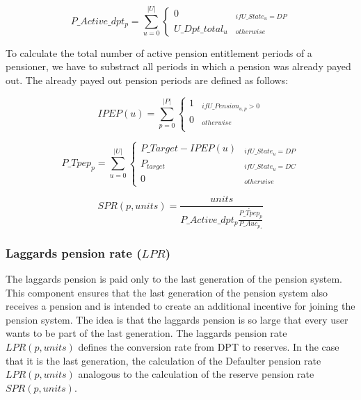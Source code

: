 \begin{equation}
P\_Active\_dpt_{p} = \sum_{u=0}^{|U|} \begin{cases} 
0 & _{if U\_State_{u} = DP}\\
U\_Dpt\_total_{u} & _{otherwise}
\end{cases}
\end{equation}

To calculate the total number of active pension entitlement periods of a pensioner, we have to substract all periods in which a pension was already payed out. The already payed out pension periods are defined as follows:

\begin{equation}
IPEP(u) = \sum_{p=0}^{|P|} \begin{cases}
1 & _{if U\_Pension_{u,p} > 0}\\
0 & _{otherwise}\\
\end{cases}
\end{equation}



\begin{dmath}
P\_Tpep_{p} = \sum_{u=0}^{|U|} \begin{cases}
P\_Target - IPEP(u)  & _{if U\_State_{u} = DP}\\
P_{target} & _{if U\_State_{u} = DC}\\
0 & _{otherwise}
\end{cases}
\end{dmath}

\begin{equation}
SPR(p, units) = \frac{units} {P\_Active\_dpt_{p} \dot {\frac{P\_Tpep_{p}} {P\_Auc_{p¸}}}
}
\end{equation}


\subsubsection{Laggards pension rate ($LPR$)}

The laggards pension is paid only to the last generation of the pension system. This component ensures that the last generation of the pension system also receives a pension and is intended to create an additional incentive for joining the pension system. The idea is that the laggards pension is so large that every user wants to be part of the last generation. 
The laggards pension rate $LPR(p, units)$ defines the conversion rate from DPT to reserves. 
In the case that it is the last generation, the calculation of the  Defaulter pension rate $LPR(p, units)$ analogous to the calculation of the reserve pension rate $SPR(p, units)$.

